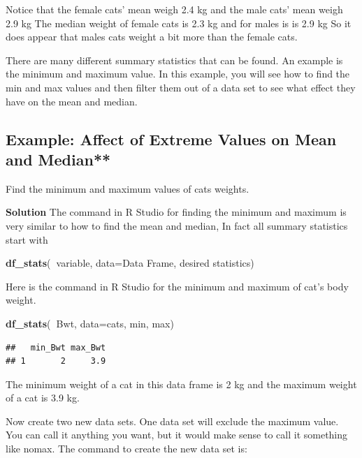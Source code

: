 \documentclass[
]{book}
\newenvironment{Shaded}{\begin{snugshade}}{\end{snugshade}}
\newcommand{\DataTypeTok}[1]{\textcolor[rgb]{0.13,0.29,0.53}{#1}}
\newcommand{\KeywordTok}[1]{\textcolor[rgb]{0.13,0.29,0.53}{\textbf{#1}}}
\newcommand{\NormalTok}[1]{#1}
\newcommand{\OperatorTok}[1]{\textcolor[rgb]{0.81,0.36,0.00}{\textbf{#1}}}
\begin{document}
Notice that the female cats' mean weigh 2.4 kg and the male cats' mean weigh 2.9 kg The median weight of female cats is 2.3 kg and for males is is 2.9 kg So it does appear that males cats weight a bit more than the female cats.

There are many different summary statistics that can be found. An example is the minimum and maximum value. In this example, you will see how to find the min and max values and then filter them out of a data set to see what effect they have on the mean and median.

\hypertarget{example-affect-of-extreme-values-on-mean-and-median}{%
\subsection{Example: Affect of Extreme Values on Mean and Median**}\label{example-affect-of-extreme-values-on-mean-and-median}}

Find the minimum and maximum values of cats weights.

\textbf{Solution}
The command in R Studio for finding the minimum and maximum is very similar to how to find the mean and median, In fact all summary statistics start with

\begin{Shaded}
\begin{Highlighting}[]
\KeywordTok{df_stats}\NormalTok{(}\OperatorTok{~}\NormalTok{variable, }\DataTypeTok{data=}\NormalTok{Data Frame, desired statistics)}
\end{Highlighting}
\end{Shaded}

Here is the command in R Studio for the minimum and maximum of cat's body weight.

\begin{Shaded}
\begin{Highlighting}[]
\KeywordTok{df_stats}\NormalTok{(}\OperatorTok{~}\NormalTok{Bwt, }\DataTypeTok{data=}\NormalTok{cats, min, max)}
\end{Highlighting}
\end{Shaded}

\begin{verbatim}
##   min_Bwt max_Bwt
## 1       2     3.9
\end{verbatim}

The minimum weight of a cat in this data frame is 2 kg and the maximum weight of a cat is 3.9 kg.

Now create two new data sets. One data set will exclude the maximum value. You can call it anything you want, but it would make sense to call it something like nomax. The command to create the new data set is:
\end{document}
